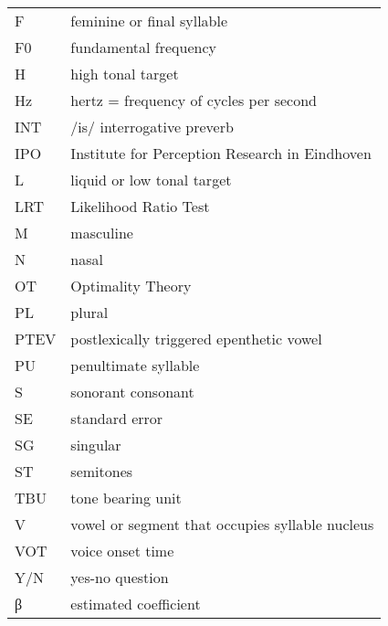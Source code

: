   \begin{tabular}{ll}
F	 & feminine or final syllable \\
F0	 & fundamental frequency \\
H	 & high tonal target \\
Hz	 & hertz = frequency of cycles per second \\
INT	 & /is/ interrogative preverb \\
IPO	 & Institute for Perception Research in Eindhoven \\ 
L 	 & liquid or low tonal target \\
LRT	 & Likelihood Ratio Test \\
M 	 & masculine \\
N	 & nasal \\
OT	 & Optimality Theory \\
PL	 & plural \\
PTEV	 & postlexically triggered epenthetic vowel \\
PU	 & penultimate syllable \\
S	 & sonorant consonant \\
SE	 & standard error \\
SG	 & singular \\
ST	 & semitones \\
TBU	 & tone bearing unit \\
V	 & vowel or segment that occupies syllable nucleus \\
VOT	 & voice onset time \\
Y/N  & 	yes-no question \\
β	 & estimated coefficient \\
  \end{tabular}
